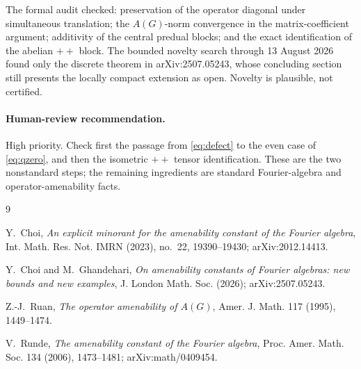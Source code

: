 \documentclass[11pt]{article}
\begin{document}
The formal audit checked: preservation of the operator diagonal under
simultaneous translation; the $A(G)$-norm convergence in the
matrix-coefficient argument; additivity of the central predual blocks; and
the exact identification of the abelian $++$ block.  The bounded novelty
search through 13 August 2026 found only the discrete theorem in
arXiv:2507.05243, whose concluding section still presents the locally compact
extension as open.  Novelty is plausible, not certified.

\paragraph{Human-review recommendation.}
High priority.  Check first the passage from \eqref{eq:defect} to the even
case of \eqref{eq:qzero}, and then the isometric $++$ tensor identification.
These are the two nonstandard steps; the remaining ingredients are standard
Fourier-algebra and operator-amenability facts.

\begin{thebibliography}{9}

Y.~Choi,
\emph{An explicit minorant for the amenability constant of the Fourier
algebra}, Int. Math. Res. Not. IMRN (2023), no.~22, 19390--19430;
arXiv:2012.14413.

Y.~Choi and M.~Ghandehari,
\emph{On amenability constants of Fourier algebras: new bounds and new
examples}, J. London Math. Soc. (2026); arXiv:2507.05243.

Z.-J.~Ruan,
\emph{The operator amenability of $A(G)$}, Amer. J. Math. 117 (1995),
1449--1474.

V.~Runde,
\emph{The amenability constant of the Fourier algebra}, Proc. Amer. Math.
Soc. 134 (2006), 1473--1481; arXiv:math/0409454.

\end{thebibliography}
\end{document}
